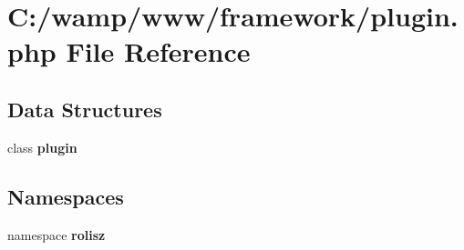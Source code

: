 \section{C:/wamp/www/framework/plugin.php File Reference}
\label{plugin_8php}
\subsection*{Data Structures}
\begin{DoxyCompactItemize}
\item 
class {\bf plugin}
\end{DoxyCompactItemize}
\subsection*{Namespaces}
\begin{DoxyCompactItemize}
\item 
namespace {\bf rolisz}
\end{DoxyCompactItemize}
